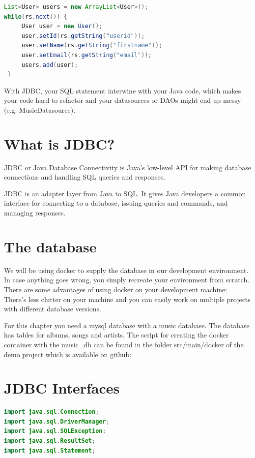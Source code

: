 \begin{lstlisting}[frame=single, language=java]
List<User> users = new ArrayList<User>();
while(rs.next()) {
     User user = new User();
     user.setId(rs.getString("userid"));
     user.setName(rs.getString("firstname"));
     user.setEmail(rs.getString("email"));
     users.add(user);
 }
 \end{lstlisting}

With JDBC, your SQL statement interwine with your Java code,  which makes your code  hard to refactor and your datasources or DAOs might end up messy (e.g.  MusicDatasource).

\section{What is JDBC?}

JDBC or Java Database Connectivity is Java's low-level API for making database connections and handling SQL queries and responses.

JDBC is an adapter layer from Java to SQL. It gives Java developers a common interface for connecting to a database, issuing queries and commands, and managing responses.


\section{The database}

We will be using docker to supply the database in our development environment.  In case anything goes wrong, you simply recreate your environment from scratch. 
There are some advantages of using docker on your development machine:
There’s less clutter on your  machine and you can easily work on multiple projects with different database versions. 

For this chapter you need a mysql database with a music database. The database has tables for albums, songs and artists. The script for creating the docker container with the music\_db can be found in the folder src/main/docker of the demo project which is available on github:


\section{JDBC Interfaces}

\begin{lstlisting}[language=java,frame=single]
import java.sql.Connection;
import java.sql.DriverManager;
import java.sql.SQLException;
import java.sql.ResultSet;
import java.sql.Statement;
\end{lstlisting}

